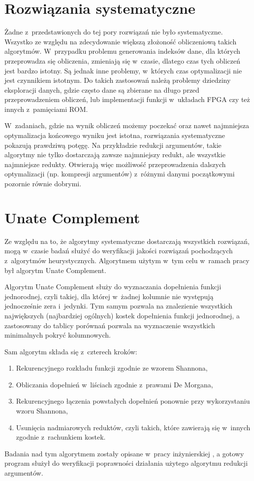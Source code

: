 \section{Rozwiązania systematyczne}

Żadne z~przedstawionych do tej pory rozwiązań nie było systematyczne.
Wszystko ze względu na zdecydowanie większą złożoność obliczeniową takich algorytmów.
W~przypadku problemu generowania indeksów dane,
dla których przeprowadza się obliczenia,
zmieniają się w~czasie,
dlatego czas tych obliczeń jest bardzo istotny.
Są jednak inne problemy,
w~których czas optymalizacji nie jest czynnikiem istotnym.
Do takich zastosowań należą problemy dziedziny eksploracji danych,
gdzie często dane są zbierane na długo przed przeprowadzeniem obliczeń,
lub implementacji funkcji w~układach FPGA czy też innych z~pamięciami ROM.

W~zadaniach, gdzie na wynik obliczeń możemy poczekać oraz nawet najmniejsza optymalizacja końcowego wyniku jest istotna,
rozwiązania systematyczne pokazują prawdziwą potęgę.
Na przykładzie redukcji argumentów,
takie algorytmy nie tylko dostarczają zawsze najmniejszy redukt,
ale wszystkie najmniejsze redukty.
Otwierają więc możliwość przeprowadzenia dalszych optymalizacji (np. kompresji argumentów) z~różnymi danymi początkowymi pozornie równie dobrymi.

\section{Unate Complement}

Ze względu na to,
że algorytmy systematyczne dostarczają wszystkich rozwiązań,
mogą w~czasie badań służyć do weryfikacji jakości rozwiązań pochodzących z~algorytmów heurystycznych.
Algorytmem użytym w~tym celu w~ramach pracy był algorytm Unate Complement.

Algorytm Unate Complement służy do wyznaczania dopełnienia funkcji jednorodnej,
czyli takiej,
dla której w~żadnej kolumnie nie występują jednocześnie zera i~jedynki.
Tym samym pozwala na znalezienie wszystkich największych (najbardziej ogólnych) kostek dopełnienia funkcji jednorodnej,
a zastosowany do tablicy porównań pozwala na wyznaczenie wszystkich minimalnych pokryć kolumnowych.

Sam algorytm składa się z~czterech kroków:
\begin{enumerate}
\item Rekurencyjnego rozkładu funkcji zgodnie ze wzorem Shannona,
\item Obliczania dopełnień w~liściach zgodnie z~prawami De Morgana,
\item Rekurencyjnego łączenia powstałych dopełnień ponownie przy wykorzystaniu wzoru Shannona,
\item Usunięcia nadmiarowych reduktów,
czyli takich,
które zawierają się w~innych zgodnie z~rachunkiem kostek.
\end{enumerate}
Badania nad tym algorytmem zostały opisane w~pracy inżynierskiej \cite{inzynierka},
a gotowy program służył do weryfikacji poprawności działania użytego algorytmu redukcji argumentów.
